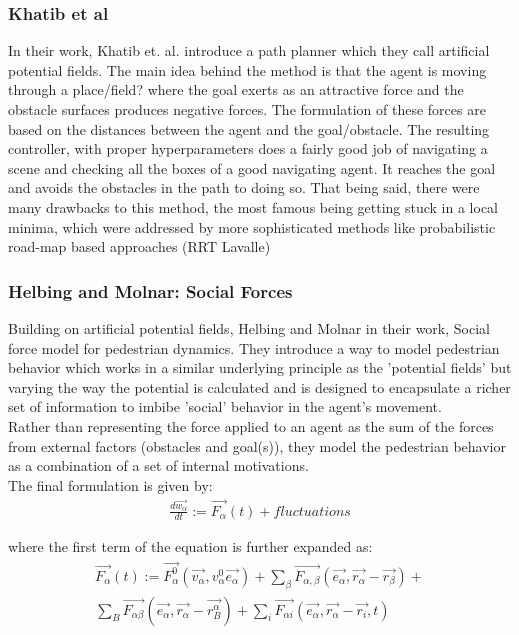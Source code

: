 \subsubsection*{Khatib et al}
In their work, Khatib et. al. introduce a path planner which they call artificial potential fields. The main idea behind the method is that the agent is moving through a place/field? where the goal exerts as an attractive force and the obstacle surfaces produces negative forces. The formulation of these forces are based on the distances between the agent and the goal/obstacle. The resulting controller, with proper hyperparameters does a fairly good job of navigating a scene and checking all the boxes of a good navigating agent. It reaches the goal and avoids the obstacles in the path to doing so. That being said, there were many drawbacks to this method, the most famous being getting stuck in a local minima, which were addressed by more sophisticated methods like probabilistic road-map based approaches (RRT Lavalle)
\subsubsection*{Helbing and Molnar: Social Forces}

Building on artificial potential fields, Helbing and Molnar in their work, Social force model for pedestrian dynamics. They introduce a way to model pedestrian behavior which works in a similar underlying principle as the 'potential fields' but varying the way the potential is calculated and is designed to encapsulate a richer set of information to imbibe 'social' behavior in the agent's movement.\\

Rather than representing the force applied to an agent as the sum of the forces from external factors (obstacles and goal(s)), they model the pedestrian behavior as a combination of a set of internal motivations.\\

The final formulation is given by:
\begin{align}
\frac{d\vec{w_{\alpha}}}{dt}:=\vec{F_{\alpha}}(t)+fluctuations
\end{align}

where the first term of the equation is further expanded as:\\

\begin{multline}
\vec{F_{\alpha}}(t):=
\vec{F_{\alpha}^{0}}(\vec{v_{\alpha}}, v_{\alpha}^{0}\vec{e_{\alpha}})+\sum_{\beta}\vec{F_{\alpha, \beta}}(\vec{e_{\alpha}}, \vec{r_{\alpha}} - \vec{r_{\beta}})
+\\\sum_{B}\vec{F_{\alpha\beta}}(\vec{e_{\alpha}}, \vec{r_{\alpha}} - \vec{r_{B}^{\alpha}}) + \sum_{i}\vec{F_{\alpha i}}(\vec{e_{\alpha}}, \vec{r_{\alpha}}-\vec{r_i},t)
\end{multline}

